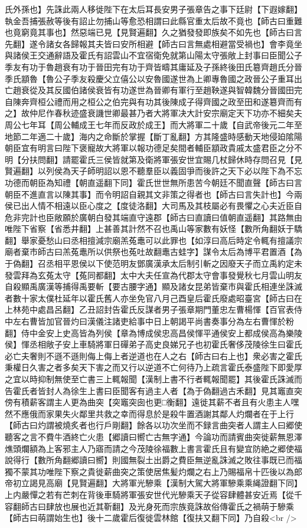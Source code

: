 氏外孫也】先誅此兩人移徙陛下在太后耳長安男子張章告之事下廷尉【下遐嫁翻】執金吾捕張赦等後有詔止勿捕山等愈恐相謂曰此縣官重太后故不竟也【師古曰重難也竟窮竟其事也】然惡端已見【見賢遍翻】久之猶發發即族矣不如先也【師古曰言先翻】遂令諸女各歸報其夫皆曰安所相避【師古曰言無處相避當受禍也】會李竟坐與諸侯王交通辭語及霍氏有詔雲山不宜宿衛免就第山陽太守張敞上封事曰臣聞公子季友有功于魯趙衰有功于晉田完有功于齊皆疇其庸延及子孫終後田氏簒齊趙氏分晉季氏顓魯【魯公子季友殺慶父立僖公以安魯國遂世為上卿專魯國之政晉公子重耳出亡趙衰從及其反國伯諸侯衰皆有功遂世為晉卿有軍行至趙鞅遂與智韓魏分晉國田完自陳奔齊桓公禮而用之桓公之伯完與有功其後陳成子得齊國之政至田和遂簒齊而有之】故仲尼作春秋迹盛衰譏世卿最甚乃者大將軍决大計安宗廟定天下功亦不細矣夫周公七年耳【周公輔成王七年而反政於成王】而大將軍二十歲【自武帝後元二年至地節二年適二十歲】海内之命斷於掌握【斷丁亂翻】方其隆盛時感動天地侵廹隂陽朝臣宜有明言曰陛下褒寵故大將軍以報功德足矣間者輔臣顓政貴戚太盛君臣之分不明【分扶問翻】請罷霍氏三侯皆就第及衛將軍張安世宜賜几杖歸休時存問召見【見賢遍翻】以列侯為天子師明詔以恩不聽羣臣以義固爭而後許之天下必以陛下為不忘功德而朝臣為知禮【朝直遥翻下同】霍氏世世無所患苦今朝廷不聞直聲【師古曰言朝臣不進直言以陳其事】而令明詔自親其文非策之得者也【師古曰言失計也】今兩侯已出人情不相遠以臣心度之【度徒洛翻】大司馬及其枝屬必有畏懼之心夫近臣自危非完計也臣敞願於廣朝白發其端直守遠郡【師古曰直讀曰值朝直遥翻】其路無由唯陛下省察【省悉井翻】上甚善其計然不召也禹山等家數有妖怪【數所角翻妖于驕翻】舉家憂愁山曰丞相擅減宗廟羔菟鼃可以此罪也【如淳曰高后時定令輒有擅議宗廟者棄市師古曰羔菟鼃所以供祭也菟吐故翻鼃古蛙字】謀令太后為博平君置酒【為于偽翻】召丞相平恩侯以下使范明友鄧廣漢承太后制引斬之因廢天子而立禹約定未發雲拜為玄菟太守【菟同都翻】太中大夫任宣為代郡太守會事發覺秋七月雲山明友自殺顯禹廣漢等捕得禹要斬【要古腰字通】顯及諸女昆弟皆棄市與霍氏相連坐誅滅者數十家太僕杜延年以霍氏舊人亦坐免官八月己酉皇后霍氏廢處昭臺宮【師古曰在上林苑中處昌呂翻】乙丑詔封告霍氏反謀者男子張章期門董忠左曹楊惲【百官表侍中左右曹皆加官晉灼曰漢儀注諸吏給事中日上朝謁平尚書奏事分為左右曹惲於粉翻】侍中金安上史高皆為列侯【章為博成侯忠高昌侯惲平通侯安上都成侯高為樂陵侯】惲丞相敞子安上車騎將軍日磾弟子高史良娣兄子也初霍氏奢侈茂陵徐生曰霍氏必亡夫奢則不遜不遜則侮上侮上者逆道也在人之右【師古曰右上也】衆必害之霍氏秉權日久害之者多矣天下害之而又行以逆道不亡何待乃上疏言霍氏泰盛陛下即愛厚之宜以時抑制無使至亡書三上輒報聞【漢制上書不行者輒報聞罷】其後霍氏誅滅而告霍氏者皆封人為徐生上書曰臣聞客有過主人者【為于偽翻過古禾翻】見其竈直突傍有積薪客謂主人更為曲突【突竈突囱也更□衡翻】遠徙其薪不者且有火患主人嘿然不應俄而家果失火鄰里共救之幸而得息於是殺牛置酒謝其鄰人灼爛者在于上行【師古曰灼謂被燒炙者也行戶剛翻】餘各以功次坐而不録言曲突者人謂主人曰郷使聽客之言不費牛酒終亡火患【郷讀曰嚮亡古無字通】今論功而請賓曲突徙薪無恩澤燋頭爛額為上客邪主人乃寤而請之今茂陵徐福數上書言霍氏且有變宜防絶之郷使福說得行【數所角翻郷讀曰嚮】則國無裂土出爵之費臣無逆亂誅滅之敗往事既已而福獨不蒙其功唯陛下察之貴徙薪曲突之策使居焦髪灼爛之右上乃賜福帛十匹後以為郎帝初立謁見高廟【見賢遍翻】大將軍光驂乘【漢制大駕大將軍驂乘乘䋲證翻下同】上内嚴憚之若有芒刺在背後車騎將軍張安世代光驂乘天子從容肆體甚安近焉【從千容翻師古曰肆放也展也近其靳翻】及光身死而宗族竟誅故俗傳霍氏之禍萌于驂乘【師古曰萌謂始生也】後十二歲霍后復徙雲林館【復扶又翻下同】乃自殺<br />
